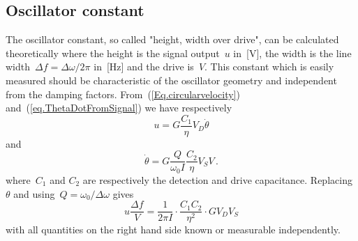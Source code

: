 \subsection{Oscillator constant}
The oscillator constant, so called "height, width over drive", can be calculated theoretically where the height is the signal output~$u$ in~[V], the width is the line width~$\Delta f = \Delta\omega/2\pi$ in~[Hz] and the drive is~$V$. This constant which is easily measured should be characteristic of the oscillator geometry and independent from the damping factors. From~(\ref{Eq.circularvelocity}) and~(\ref{eq.ThetaDotFromSignal}) we have respectively
\begin{equation}
u = G\frac{C_1}{\eta}V_D\dot{\theta}
\end{equation}
and
\begin{equation}
\dot{\theta} = G\frac{Q}{\omega_0 I}\frac{C_2}{\eta}V_S V \,.
\end{equation}
where~$C_1$ and $C_2$ are respectively the detection and drive capacitance. Replacing~$\theta$ and using~$Q=\omega_0/\Delta\omega$ gives
\begin{equation}
u\frac{\Delta f}{V} =
\frac{1}{2\pi I} \cdot \frac{C_1 C_2}{\eta^2} \cdot G V_D V_S
\end{equation}
with all quantities on the right hand side known or measurable independently. 
